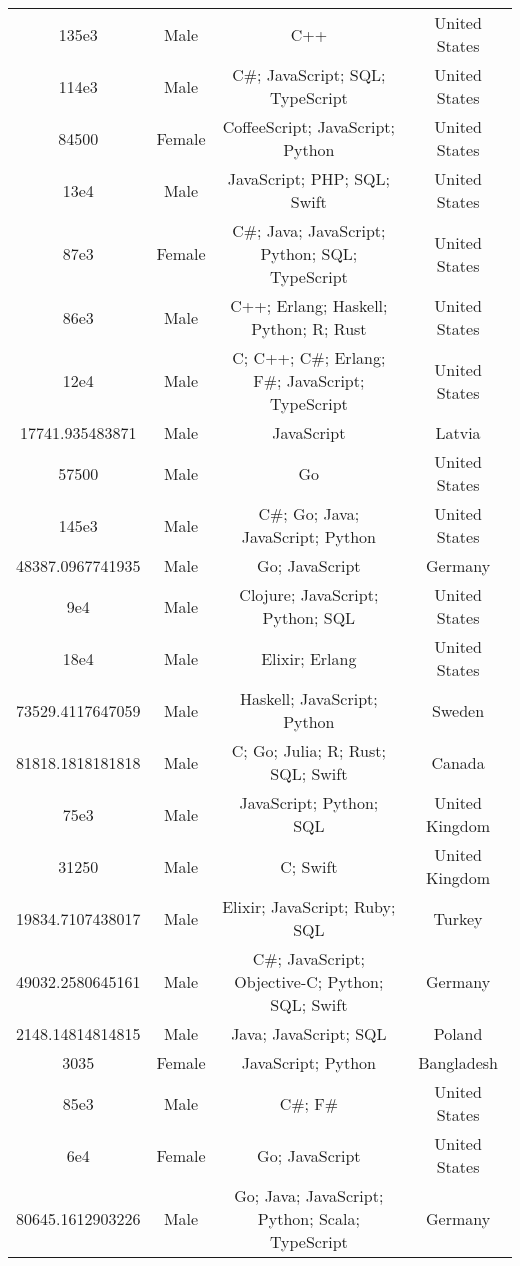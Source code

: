 \begin{center}
\begin{tabular}{ |c|c|c|c| }
135e3  &  Male  &  C++  &  United States  \\ 
114e3  &  Male  &  C\#; JavaScript; SQL; TypeScript  &  United States  \\ 
84500  &  Female  &  CoffeeScript; JavaScript; Python  &  United States  \\ 
13e4  &  Male  &  JavaScript; PHP; SQL; Swift  &  United States  \\ 
87e3  &  Female  &  C\#; Java; JavaScript; Python; SQL; TypeScript  &  United States  \\ 
86e3  &  Male  &  C++; Erlang; Haskell; Python; R; Rust  &  United States  \\ 
12e4  &  Male  &  C; C++; C\#; Erlang; F\#; JavaScript; TypeScript  &  United States  \\ 
17741.935483871  &  Male  &  JavaScript  &  Latvia  \\ 
57500  &  Male  &  Go  &  United States  \\ 
145e3  &  Male  &  C\#; Go; Java; JavaScript; Python  &  United States  \\ 
48387.0967741935  &  Male  &  Go; JavaScript  &  Germany  \\ 
9e4  &  Male  &  Clojure; JavaScript; Python; SQL  &  United States  \\ 
18e4  &  Male  &  Elixir; Erlang  &  United States  \\ 
73529.4117647059  &  Male  &  Haskell; JavaScript; Python  &  Sweden  \\ 
81818.1818181818  &  Male  &  C; Go; Julia; R; Rust; SQL; Swift  &  Canada  \\ 
75e3  &  Male  &  JavaScript; Python; SQL  &  United Kingdom  \\ 
31250  &  Male  &  C; Swift  &  United Kingdom  \\ 
19834.7107438017  &  Male  &  Elixir; JavaScript; Ruby; SQL  &  Turkey  \\ 
49032.2580645161  &  Male  &  C\#; JavaScript; Objective-C; Python; SQL; Swift  &  Germany  \\ 
2148.14814814815  &  Male  &  Java; JavaScript; SQL  &  Poland  \\ 
3035  &  Female  &  JavaScript; Python  &  Bangladesh  \\ 
85e3  &  Male  &  C\#; F\#  &  United States  \\ 
6e4  &  Female  &  Go; JavaScript  &  United States  \\ 
80645.1612903226  &  Male  &  Go; Java; JavaScript; Python; Scala; TypeScript  &  Germany  \\ 

\end{tabular}
\end{center}
